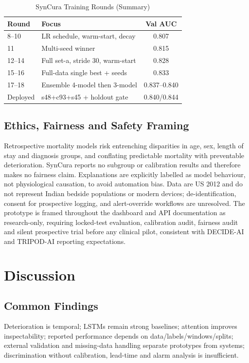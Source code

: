 \documentclass[a4paper,conference]{IEEEtran}
\begin{document}
\begin{table}[htbp]
\caption{SynCura Training Rounds (Summary)}
\label{tab:rounds}
\centering
\footnotesize
\setlength{\tabcolsep}{4pt}
\begin{tabular}{llc}
\toprule
Round & Focus & Val AUC \\
\midrule
8--10 & LR schedule, warm-start, decay & 0.807 \\
11 & Multi-seed winner & 0.815 \\
12--14 & Full set-a, stride 30, warm-start & 0.828 \\
15--16 & Full-data single best + seeds & 0.833 \\
17--18 & Ensemble 4-model then 3-model & 0.837--0.840 \\
Deployed & s48+c93+s45 + holdout gate & 0.840/0.844 \\
\bottomrule
\end{tabular}
\end{table}

\subsection{Ethics, Fairness and Safety Framing}
Retrospective mortality models risk entrenching disparities in age, sex, length of stay and diagnosis groups, and conflating predictable mortality with preventable deterioration. SynCura reports no subgroup or calibration results and therefore makes no fairness claim. Explanations are explicitly labelled as model behaviour, not physiological causation, to avoid automation bias. Data are US 2012 and do not represent Indian bedside populations or modern devices; de-identification, consent for prospective logging, and alert-override workflows are unresolved. The prototype is framed throughout the dashboard and API documentation as research-only, requiring locked-test evaluation, calibration audit, fairness audit and silent prospective trial before any clinical pilot, consistent with DECIDE-AI and TRIPOD-AI reporting expectations.

\section{Discussion}
\subsection{Common Findings}
Deterioration is temporal; LSTMs remain strong baselines; attention improves inspectability; reported performance depends on data/labels/windows/splits; external validation and missing-data handling separate prototypes from systems; discrimination without calibration, lead-time and alarm analysis is insufficient.
\end{document}
